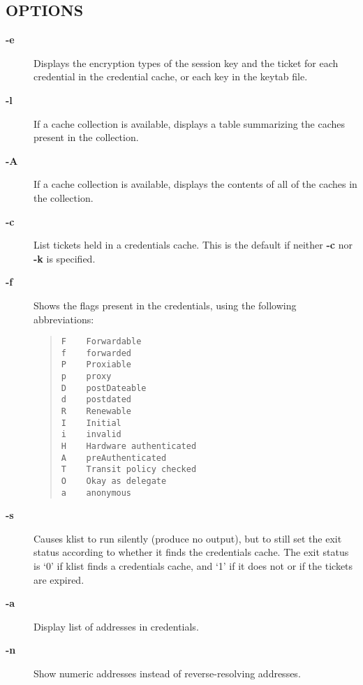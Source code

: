 \documentclass[letterpaper,10pt,english]{sphinxmanual}
\begin{document}
\subsection{OPTIONS}
\label{user/user_commands/klist:options}\begin{description}
\item[{\textbf{-e}}] \leavevmode
Displays the encryption types of the session key and the ticket
for each credential in the credential cache, or each key in the
keytab file.

\item[{\textbf{-l}}] \leavevmode
If a cache collection is available, displays a table summarizing
the caches present in the collection.

\item[{\textbf{-A}}] \leavevmode
If a cache collection is available, displays the contents of all
of the caches in the collection.

\item[{\textbf{-c}}] \leavevmode
List tickets held in a credentials cache. This is the default if
neither \textbf{-c} nor \textbf{-k} is specified.

\item[{\textbf{-f}}] \leavevmode
Shows the flags present in the credentials, using the following
abbreviations:
\begin{quote}

\begin{Verbatim}[commandchars=\\\{\}]
F    Forwardable
f    forwarded
P    Proxiable
p    proxy
D    postDateable
d    postdated
R    Renewable
I    Initial
i    invalid
H    Hardware authenticated
A    preAuthenticated
T    Transit policy checked
O    Okay as delegate
a    anonymous
\end{Verbatim}
\end{quote}

\item[{\textbf{-s}}] \leavevmode
Causes klist to run silently (produce no output), but to still set
the exit status according to whether it finds the credentials
cache.  The exit status is `0' if klist finds a credentials cache,
and `1' if it does not or if the tickets are expired.

\item[{\textbf{-a}}] \leavevmode
Display list of addresses in credentials.

\item[{\textbf{-n}}] \leavevmode
Show numeric addresses instead of reverse-resolving addresses.


\end{description}
\end{document}
